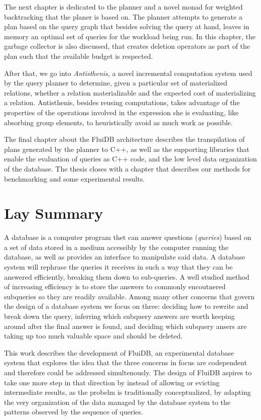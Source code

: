 \begin{precontent}
The next chapter is dedicated to the planner and a novel monad for
weighted backtracking that the planer is based on. The planner
attempts to generate a plan based on the query graph that besides
solving the query at hand, leaves in memory an optimal set of queries
for the workload being run. In this chapter, the garbage collector is
also discussed, that creates deletion operators as part of the plan
such that the available budget is respected.

After that, we go into \emph{Antisthenis}, a novel incremental
computation system used by the query planner to determine, given a
particular set of materialized relations, whether a relation
materializable and the expected cost of materializing a
relation. Antisthenis, besides reusing computations, takes advantage
of the properties of the operations involved in the expression she is
evaluating, like absorbing group elements, to heuristically avoid as
much work as possible.

The final chapter about the FluiDB architecture describes the
transpilation of plans generated by the planner to C++, as well as the
supporting libraries that enable the evaluation of queries as C++
code, and the low level data organization of the database. The thesis
closes with a chapter that describes our methods for benchmarking and
some experimental results.

\chapter{Lay Summary}%

A database is a computer program thet can answer questions
(\emph{queries}) based on a set of data stored in a medium accessibly
by the computer running the database, as well as provides an interface
to manipulate said data. A database system will rephrase the queries
it receives in such a way that they can be answered efficiently,
breaking them down to sub-queries. A well studied method of increasing
efficiency is to store the answers to commonly encoutnered subqueries
so they are readily available. Among many other concerns that govern
the design of a database system we focus on three: deciding how to
rewrite and break down the query, inferring which subquery answers are
worth keeping around after the final answer is found, and deciding
which subquery ansers are taking up too much valuable space and should
be deleted.

This work describes the development of FluiDB, an experimental
database system that explores the idea that the three concerns in
focus are codependent and therefore could be addressed
simultenously. The design of FluiDB aspires to take one more step in
that direction by instead of allowing or evicting intermediate
results, as the probelm is traditionally conceptualized, by adapting
the very organization of the data managed by the database system to
the patterns observed by the sequence of queries.


\end{precontent}
